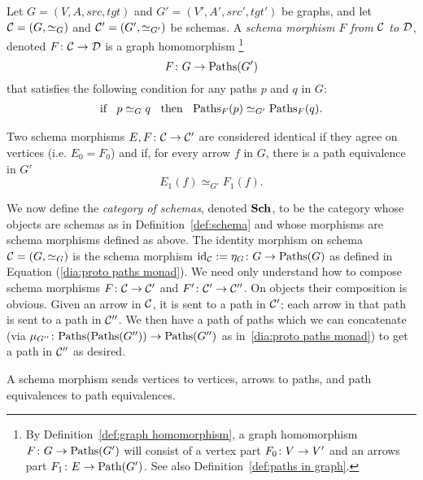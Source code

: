 \documentclass[CT4S-EN-RU]{subfiles}
\begin{document}
\begin{definitionENG}\label{def:schema morphism}
Let $G=(V,A,src,tgt)$ and $G'=(V',A',src',tgt')$ be graphs, and let $\mathcal{C}=(G,\simeq_G)$ and $\mathcal{C}'=(G',\simeq_{G'})$ be schemas. A {\em schema morphism $F$ from $\mathcal{C}$ to $\mathcal{D}$}, denoted $F\colon\mathcal{C}\rightarrow\mathcal{D}$ is a graph homomorphism 
\footnote{By Definition~\ref{def:graph homomorphism}, a graph homomorphism $F\colon G\rightarrow\textnormal{Paths}(G')$ will consist of a vertex part $F_0\colon V\rightarrow V'$ and an arrows part $F_1\colon E\rightarrow\textnormal{Path}(G')$. See also Definition~\ref{def:paths in graph}.}
$$F\colon G\rightarrow\textnormal{Paths}(G')$$ that satisfies the following condition for any paths $p$ and $q$ in $G$: 
\begin{align}\label{dia:path cond for schema morphism}
\textnormal{if \;\;$p\simeq_G q$ \;\;then\;\; $\textnormal{Paths}_F(p)\simeq_{G'}\textnormal{Paths}_F(q)$}.
\end{align}

Two schema morphisms $E,F\colon\mathcal{C}\rightarrow\mathcal{C}'$ are considered identical if they agree on vertices (i.e. $E_0=F_0$) and if, for every arrow $f$ in $G$, there is a path equivalence in $G'$ $$E_1(f)\simeq_{G'}F_1(f).$$

We now define the {\em category of schemas}, denoted ${\mathbf{Sch}}$, to be the category whose objects are schemas as in Definition~\ref{def:schema} and whose morphisms are schema morphisms defined as above. The identity morphism on schema $\mathcal{C}=(G,\simeq_G)$ is the schema morphism $\textnormal{id}_\mathcal{C}:=\eta_G\colon G\rightarrow\textnormal{Paths}(G)$ as defined in Equation (\ref{dia:proto paths monad}). We need only understand how to compose schema morphisms $F\colon\mathcal{C}\rightarrow\mathcal{C}'$ and $F'\colon\mathcal{C}'\rightarrow\mathcal{C}''$. On objects their composition is obvious. Given an arrow in $\mathcal{C}$, it is sent to a path in $\mathcal{C}'$; each arrow in that path is sent to a path in $\mathcal{C}''$. We then have a path of paths which we can concatenate (via $\mu_{G''}\colon\textnormal{Paths}(\textnormal{Paths}(G''))\rightarrow\textnormal{Paths}(G'')$ as in~\ref{dia:proto paths monad}) to get a path in $\mathcal{C}''$ as desired.
\end{definitionENG}

\begin{definitionRUS}\label{def:schema morphism}
\end{definitionRUS}

\begin{sloganENG}
A schema morphism sends vertices to vertices, arrows to paths, and path equivalences to path equivalences.
\end{sloganENG}
\end{document}
